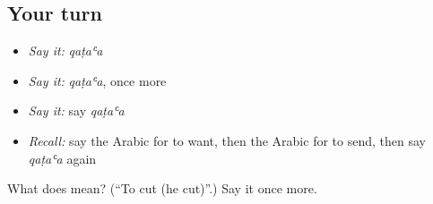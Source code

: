 \subsection*{Your turn}
\begin{itemize}
\raggedright
  \item \emph{Say it:} \emph{qaṭaʿa}
  \item \emph{Say it:} \emph{qaṭaʿa}, once more
  \item \emph{Say it:} say \emph{qaṭaʿa}
  \item \emph{Recall:} say the Arabic for to want, then the Arabic for to send, then say \emph{qaṭaʿa} again
\end{itemize}

\begin{tcolorbox}[breakable,colback=teal!4,colframe=teal!35!black,title={Before you move on}]
What does  mean? (\textquotedblleft{}To cut (he cut)\textquotedblright{}.) Say it once more.
\end{tcolorbox}
